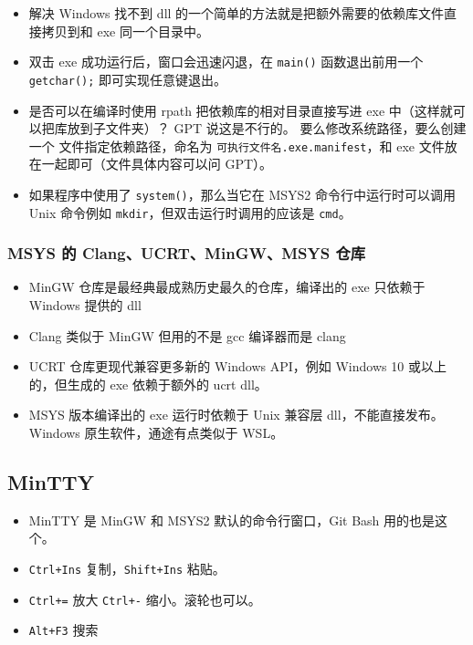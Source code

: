 \begin{itemize}
\item 解决 Windows 找不到 dll 的一个简单的方法就是把额外需要的依赖库文件直接拷贝到和 exe 同一个目录中。
\item 双击 exe 成功运行后，窗口会迅速闪退，在 \verb`main()` 函数退出前用一个 \verb`getchar();` 即可实现任意键退出。
\item 是否可以在编译时使用 rpath 把依赖库的相对目录直接写进 exe 中（这样就可以把库放到子文件夹）？ GPT 说这是不行的。 要么修改系统路径，要么创建一个  文件指定依赖路径，命名为 \verb`可执行文件名.exe.manifest`，和 exe 文件放在一起即可（文件具体内容可以问 GPT）。
\item 如果程序中使用了 \verb`system()`，那么当它在 MSYS2 命令行中运行时可以调用 Unix 命令例如 \verb`mkdir`，但双击运行时调用的应该是 \verb`cmd`。
\end{itemize}

\subsubsection{MSYS 的 Clang、UCRT、MinGW、MSYS 仓库}
\begin{itemize}
\item MinGW 仓库是最经典最成熟历史最久的仓库，编译出的 exe 只依赖于 Windows 提供的 dll
\item Clang 类似于 MinGW 但用的不是 gcc 编译器而是 clang
\item UCRT 仓库更现代兼容更多新的 Windows API，例如 Windows 10 或以上的，但生成的 exe 依赖于额外的 ucrt dll。
\item MSYS 版本编译出的 exe 运行时依赖于 Unix 兼容层 dll，不能直接发布。 Windows 原生软件，通途有点类似于 WSL。
\end{itemize}

\subsection{MinTTY}
\begin{itemize}
\item MinTTY 是 MinGW 和 MSYS2 默认的命令行窗口，Git Bash 用的也是这个。
\item \verb`Ctrl+Ins` 复制，\verb`Shift+Ins` 粘贴。
\item \verb`Ctrl+=` 放大 \verb`Ctrl+-` 缩小。滚轮也可以。
\item \verb`Alt+F3` 搜索
\end{itemize}
